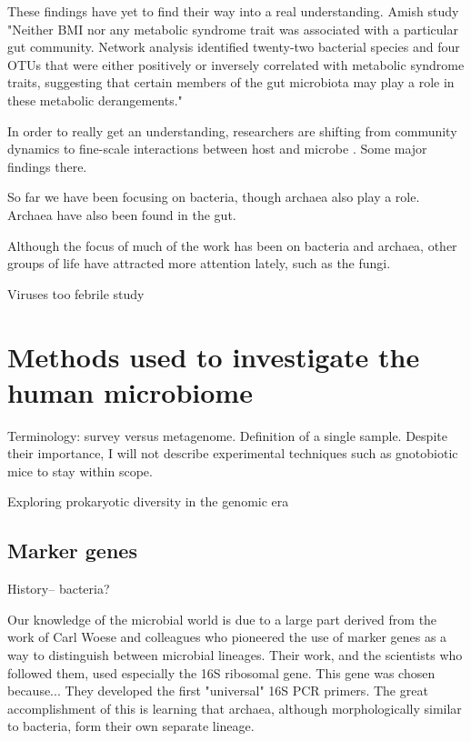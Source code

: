 \documentclass{amsart}
\begin{document}
These findings have yet to find their way into a real understanding.
Amish study \cite{zupancic2012analysis}
"Neither BMI nor any metabolic syndrome trait was associated with a particular gut community. Network analysis identified twenty-two bacterial species and four OTUs that were either positively or inversely correlated with metabolic syndrome traits, suggesting that certain members of the gut microbiota may play a role in these metabolic derangements."

In order to really get an understanding, researchers are shifting from community dynamics to fine-scale interactions between host and microbe \cite{hooper2012interactions}.
Some major findings there.

So far we have been focusing on bacteria, though archaea also play a role.
Archaea have also been found in the gut.

Although the focus of much of the work has been on bacteria and archaea, other groups of life have attracted more attention lately, such as the fungi.

Viruses too
febrile study \cite{wylie2012sequence}


\section{Methods used to investigate the human microbiome}

Terminology: survey versus metagenome.
Definition of a single sample.
Despite their importance, I will not describe experimental techniques such as gnotobiotic mice to stay within scope.

\cite{hugenholtz2002review}
{Exploring prokaryotic diversity in the genomic era}


\subsection{Marker genes}
History-- bacteria?

Our knowledge of the microbial world is due to a large part derived from the work of Carl Woese and colleagues who pioneered the use of marker genes as a way to distinguish between microbial lineages.
Their work, and the scientists who followed them, used especially the 16S ribosomal gene.
This gene was chosen because...
They developed the first "universal" 16S PCR primers.
The great accomplishment of this is learning that archaea, although morphologically similar to bacteria, form their own separate lineage.
\end{document}
